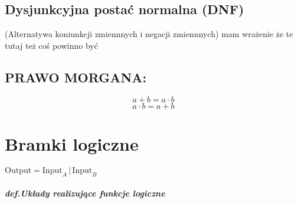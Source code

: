 \documentclass{article}
\begin{document}
\subsection{Dysjunkcyjna postać normalna (DNF)}
(Alternatywa koniunkcji zmiennnych i negacji zmiennnych)
mam wrażenie że te tutaj też coś powinno być

\subsection{PRAWO MORGANA:}
\[a + b = a \cdot b\]
\[a \cdot b = a + b\]

\section{Bramki logiczne}
\( \text{Output} = \text{Input}_A \, | \, \text{Input}_B \)

	\subparagraph{\textit{def.}Układy realizujące funkcje logiczne}
\end{document}
